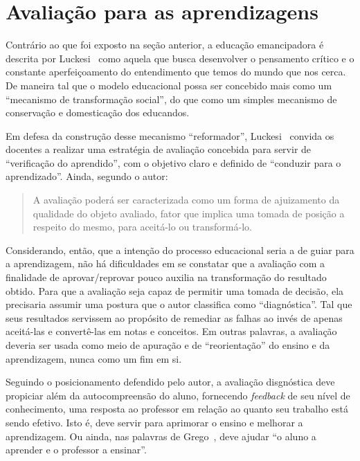 \section{Avaliação para as aprendizagens}%

Contrário ao que foi exposto na seção anterior, a educação emancipadora é descrita por Luckesi~\cite{luckesi2014avaliaccao} como aquela que busca desenvolver o pensamento crítico e o constante aperfeiçoamento do entendimento que temos do mundo que nos cerca. De maneira tal que o modelo educacional possa ser concebido mais como um ``mecanismo de transformação social'', do que como um simples mecanismo de conservação e domesticação dos educandos.

Em defesa da construção desse mecanismo ``reformador'', Luckesi~\cite{luckesi2014avaliaccao} convida os docentes a realizar uma estratégia de avaliação concebida para servir de ``verificação do aprendido'', com o objetivo claro e definido de ``conduzir para o aprendizado''. Ainda, segundo o autor:

\begin{quote}
A avaliação poderá ser caracterizada como um forma de ajuizamento da qualidade do objeto avaliado, fator que implica uma tomada de posição a respeito do mesmo, para aceitá-lo ou transformá-lo. ~\cite{luckesi1978}
\end{quote}%

Considerando, então, que a intenção do processo educacional seria a de guiar para a aprendizagem, não há dificuldades em se constatar que a avaliação com a finalidade de aprovar/reprovar pouco auxilia na transformação do resultado obtido. Para que a avaliação seja capaz de permitir uma tomada de decisão, ela precisaria assumir uma postura que o autor classifica como ``diagnóstica''. Tal que seus resultados servissem ao propósito de remediar as falhas ao invés de apenas aceitá-las e convertê-las em notas e conceitos. Em outras palavras, a avaliação deveria ser usada como meio de apuração e de ``reorientação'' do ensino e da aprendizagem, nunca como um fim em si.  
 
Seguindo o posicionamento defendido pelo autor, a avaliação disgnóstica deve propiciar além da autocompreensão do aluno, fornecendo \textit{feedback} de seu nível de conhecimento, uma resposta ao professor em relação ao quanto seu trabalho está sendo efetivo. Isto é, deve servir para aprimorar o ensino e melhorar a aprendizagem. Ou ainda, nas palavras de Grego~\cite{grego@2013}, deve ajudar ``o aluno a aprender e o professor a ensinar''.

